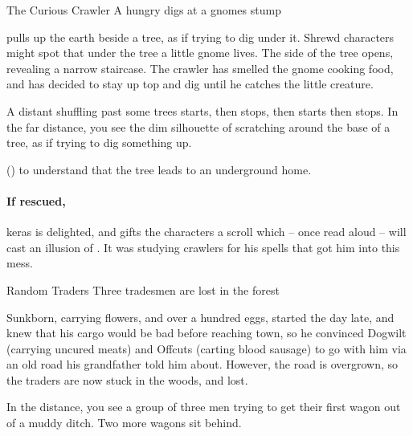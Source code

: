 \label{interruptions}

{The Curious Crawler}%
{A hungry  digs at a gnomes stump}%

 pulls up the earth beside a tree, as if trying to dig under it.
Shrewd characters might spot that under the tree a little gnome lives.
The side of the tree opens, revealing a narrow staircase.
The \gls{crawler} has smelled the gnome cooking food, and has decided to stay up top and dig until he catches the little creature.

\begin{boxtext}
  A distant shuffling past some trees starts, then stops, then starts then stops.
  In the far distance, you see the dim silhouette of  scratching around the base of a tree, as if trying to dig something up.
\end{boxtext}

 (\tn[9]) to understand that the tree leads to an underground home.

\chitincrawler

\keras

\paragraph{If rescued,}
\gls{keras} is delighted, and gifts the characters a scroll which -- once read aloud -- will cast an illusion of .
It was studying \glspl{crawler} for his spells that got him into this mess.

{Random Traders}%
{Three tradesmen are lost in the forest}%

Sunkborn, carrying flowers, and over a hundred eggs, started the day late, and knew that his cargo would be bad before reaching \gls{town}, so he convinced Dogwilt (carrying uncured meats) and Offcuts (carting blood sausage) to go with him via an old road his grandfather told him about.
However, the road is overgrown, so the traders are now stuck in the woods, and lost.

\begin{boxtext}
  In the distance, you see a group of three men trying to get their first wagon out of a muddy ditch.
  Two more wagons sit behind.
\end{boxtext}


